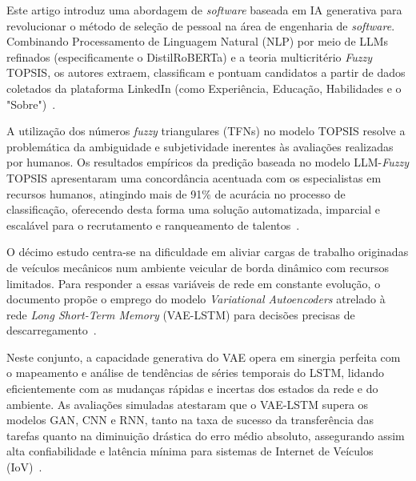 Este artigo introduz uma abordagem de \textit{software} baseada em \gls{IA} generativa para revolucionar o método de seleção de pessoal na área de engenharia de \textit{software}. Combinando Processamento de Linguagem Natural (NLP) por meio de \glspl{LLM} refinados (especificamente o DistilRoBERTa) e a teoria multicritério \textit{\textit{Fuzzy}} \gls{TOPSIS}, os autores extraem, classificam e pontuam candidatos a partir de dados coletados da plataforma LinkedIn (como Experiência, Educação, Habilidades e o "Sobre")~\cite{hoque2024}.

A utilização dos números \textit{\textit{fuzzy}} triangulares (TFNs) no modelo \gls{TOPSIS} resolve a problemática da ambiguidade e subjetividade inerentes às avaliações realizadas por humanos. Os resultados empíricos da predição baseada no modelo LLM-\textit{\textit{Fuzzy}} \gls{TOPSIS} apresentaram uma concordância acentuada com os especialistas em recursos humanos, atingindo mais de 91\% de acurácia no processo de classificação, oferecendo desta forma uma solução automatizada, imparcial e escalável para o recrutamento e ranqueamento de talentos~\cite{hoque2024}.

O décimo estudo centra-se na dificuldade em aliviar cargas de trabalho originadas de veículos mecânicos num ambiente veicular de borda dinâmico com recursos limitados. Para responder a essas variáveis de rede em constante evolução, o documento propõe o emprego do modelo \textit{Variational Autoencoders} atrelado à rede \textit{Long Short-Term Memory} (VAE-LSTM) para decisões precisas de descarregamento~\cite{xiang2026}.

Neste conjunto, a capacidade generativa do VAE opera em sinergia perfeita com o mapeamento e análise de tendências de séries temporais do \gls{LSTM}, lidando eficientemente com as mudanças rápidas e incertas dos estados da rede e do ambiente. As avaliações simuladas atestaram que o VAE-LSTM supera os modelos \gls{GAN}, CNN e \gls{RNN}, tanto na taxa de sucesso da transferência das tarefas quanto na diminuição drástica do erro médio absoluto, assegurando assim alta confiabilidade e latência mínima para sistemas de Internet de Veículos (\gls{IoV})~\cite{xiang2026}.




